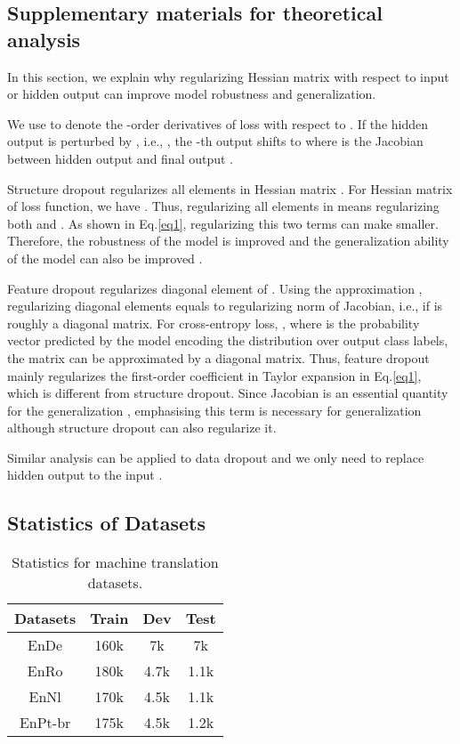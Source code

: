 \documentclass[11pt]{article}
\begin{document}
\subsection{Supplementary materials for theoretical analysis}
\label{sec:appendix_theoretic}
In this section, we explain why regularizing Hessian matrix with respect to input or hidden output can improve model robustness and generalization.

We use  to denote the -order derivatives of loss  with respect to . If the hidden output is perturbed by , i.e., , the -th output  shifts to 
where  is the Jacobian between hidden output  and final output . 

Structure dropout regularizes all elements in Hessian matrix . For Hessian matrix of loss function, we have 
. Thus, regularizing all elements in  means regularizing both  and . As shown in Eq.\ref{eq1}, regularizing this two terms can make  smaller. Therefore, the robustness of the model is improved and the generalization ability of the model can also be improved \cite{hoffman2019robust,jakubovitz2018improving}.

Feature dropout regularizes diagonal element of . Using the approximation \cite{wei2020implicit}, regularizing diagonal elements  equals to regularizing norm of Jacobian, i.e.,  if  is roughly a diagonal matrix. For cross-entropy loss, , where  is the probability vector predicted by the model encoding the distribution over output class labels, the matrix  can be approximated by a diagonal matrix.  Thus, feature dropout mainly regularizes the first-order coefficient  in Taylor expansion in Eq.\ref{eq1}, which is different from structure dropout. Since Jacobian is an essential quantity for the generalization \cite{wei2020implicit,hoffman2019robust}, emphasising this term is necessary for generalization although structure dropout can also regularize it.

Similar analysis can be applied to data dropout and we only need to replace hidden output  to the input .


\subsection{Statistics of Datasets}
\label{sec:class_data_stat}


\begin{table}[!tbp]
\centering
{
		\centering
		\begin{tabular}{c | c c c}
			\hline
            Datasets & Train & Dev & Test  \\
            \hline
            EnDe & 160k & 7k & 7k \\
            EnRo & 180k & 4.7k & 1.1k \\
            EnNl & 170k & 4.5k  & 1.1k \\
            EnPt-br & 175k  & 4.5k & 1.2k \\
			\hline
	\end{tabular} }
	\caption{Statistics for machine translation datasets.} 
	\label{mt_statistics}
\end{table}
\end{document}
